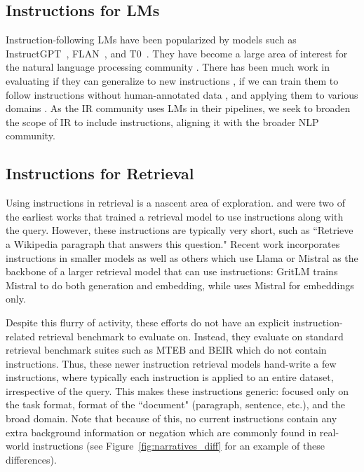 \documentclass{article} %
\begin{document}
\subsection{Instructions for LMs}
Instruction-following LMs have been popularized by models such as InstructGPT~\citep{instructGPT}, FLAN~\citep{wei2022finetuned}, and T0~\citep{sanh2022multitask}. 
They have become a large area of interest for the natural language processing community \citep{touvron2023llama,Jiang2023Mistral7,Groeneveld2024OLMoAT,Black2022GPTNeoX20BAO}. There has been much work in evaluating if they can generalize to new instructions \citep{weller2020learning,wang2022super,ouyang2022training}, if we can train them to follow instructions without human-annotated data \citep{wang2022self,qin2023toolllm}, and applying them to various domains \citep{zhao2021evaluation,singhal2023large,shaghaghian2020customizing}. As the IR community uses LMs in their pipelines, we seek to broaden the scope of IR to include instructions, aligning it with the broader NLP community.

\subsection{Instructions for Retrieval}
Using instructions in retrieval is a nascent area of exploration. \citet{INSTRUCTOR} and \citet{asai2022tart} were two of the earliest works that trained a retrieval model to use instructions along with the query. However, these instructions are typically very short, such as ``Retrieve a Wikipedia paragraph that answers this question."  Recent work incorporates instructions in smaller models \citep{bge_embedding,bge_m3,chen2024generalizing} as well as others which use Llama \citep{touvron2023llama,weller2023generative} or Mistral \citep{Jiang2023Mistral7} as the backbone of a larger retrieval model that can use instructions: GritLM \citep{muennighoff2024generative} trains Mistral to do both generation and embedding, while \citet{wang2023improving} uses Mistral for embeddings only.

Despite this flurry of activity, these efforts do not have an explicit instruction-related retrieval benchmark to evaluate on. Instead, they evaluate on standard retrieval benchmark suites such as MTEB \citep{muennighoff2022mteb} and BEIR \citep{thakur2021beir} which do not contain instructions. Thus, these newer instruction retrieval models hand-write a few instructions, where typically each instruction is applied to an entire dataset, irrespective of the query. This makes these instructions generic: focused only on the task format, format of the ``document" (paragraph, sentence, etc.), and the broad domain. Note that because of this, no current instructions contain any extra background information or negation \citep{Weller2024NevIRNI} which are commonly found in real-world instructions (see Figure~\ref{fig:narratives_diff} for an example of these differences).
\end{document}
